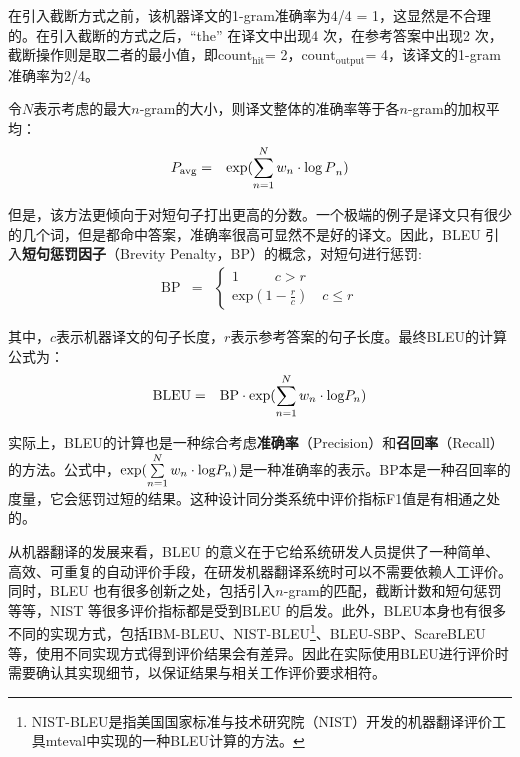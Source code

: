 \parinterval 在引入截断方式之前，该机器译文的1-gram准确率为4/4 = 1，这显然是不合理的。在引入截断的方式之后，“the” 在译文中出现4 次，在参考答案中出现2 次，截断操作则是取二者的最小值，即$\textrm{count}_{\textrm{hit}}$= 2，$\textrm{count}_{\textrm{output}}$= 4，该译文的1-gram准确率为2/4。

\parinterval 令$N$表示考虑的最大$n$-gram的大小，则译文整体的准确率等于各$n$-gram的加权平均：
\begin{eqnarray}
{{P}_{{\textrm{avg}}}} &=& \exp (\sum\limits_{n = 1}^N {{w_n} \cdot {{{\mathop{\log{P}}\nolimits} }_n}} )
\label{eq:4-5}
\end{eqnarray}

\parinterval 但是，该方法更倾向于对短句子打出更高的分数。一个极端的例子是译文只有很少的几个词，但是都命中答案，准确率很高可显然不是好的译文。因此，BLEU 引入{\small\sffamily\bfseries{短句惩罚因子}}（Brevity Penalty，BP）的概念，对短句进行惩罚:
\begin{eqnarray}
\textrm {BP} &=& \left\{ \begin{array}{l}
1\quad \quad \;\;c > r\\
{\textrm{exp}}(1 - \frac{r}{c})\quad c \le r
\end{array} \right.
\label{eq:4-6}
\end{eqnarray}

\noindent 其中，$c$表示机器译文的句子长度，$r$表示参考答案的句子长度。最终BLEU的计算公式为：
\begin{eqnarray}
\textrm {BLEU} &=& \textrm {BP} \cdot \exp(\sum\limits_{n = 1}^N {{w_n} \cdot {{{\mathop{\textrm {log}}\nolimits} }{P}_n}} )
\label{eq:4-7}
\end{eqnarray}

\parinterval 实际上，BLEU的计算也是一种综合考虑{\small\sffamily\bfseries{准确率}}（Precision）和{\small\sffamily\bfseries{召回率}}（Recall）的方法。公式中，$\exp(\sum\limits_{n = 1}^N {{w_n} \cdot {{{\mathop{\textrm {log}}\nolimits} }{P}_n}} )$是一种准确率的表示。BP本是一种召回率的度量，它会惩罚过短的结果。这种设计同分类系统中评价指标F1值是有相通之处的。

\parinterval 从机器翻译的发展来看，BLEU 的意义在于它给系统研发人员提供了一种简单、高效、可重复的自动评价手段，在研发机器翻译系统时可以不需要依赖人工评价。同时，BLEU 也有很多创新之处，包括引入$n$-gram的匹配，截断计数和短句惩罚等等，NIST 等很多评价指标都是受到BLEU 的启发。此外，BLEU本身也有很多不同的实现方式，包括IBM-BLEU、NIST-BLEU\footnote{NIST-BLEU是指美国国家标准与技术研究院（NIST）开发的机器翻译评价工具mteval中实现的一种BLEU计算的方法。}、BLEU-SBP、ScareBLEU等，使用不同实现方式得到评价结果会有差异。因此在实际使用BLEU进行评价时需要确认其实现细节，以保证结果与相关工作评价要求相符。

